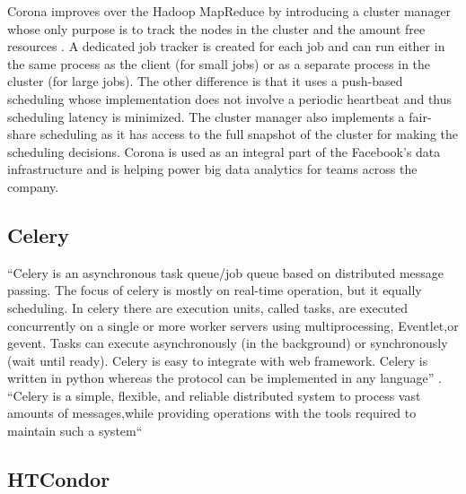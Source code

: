      Corona improves over the Hadoop MapReduce by introducing a
     cluster manager whose only purpose is to track the nodes in the
     cluster and the amount free resources
     \cite{www-facebook-corona}. A dedicated job tracker is created
     for each job and can run either in the same process as the
     client (for small jobs) or as a separate process in the cluster
     (for large jobs). The other difference is that it uses a
     push-based scheduling whose implementation does not involve a
     periodic heartbeat and thus scheduling latency is minimized. The
     cluster manager also implements a fair-share scheduling as it has
     access to the full snapshot of the cluster for making the
     scheduling decisions. Corona is used as an integral part of the
     Facebook's data infrastructure and is helping power big data
     analytics for teams across the company.
     
\subsection{Celery}

     ``Celery is an asynchronous task queue/job queue based on
     distributed message passing.  The focus of celery is mostly on
     real-time operation, but it equally scheduling.  In celery there
     are execution units, called tasks, are executed concurrently on a
     single or more worker servers using multiprocessing, Eventlet,or
     gevent.  Tasks can execute asynchronously (in the background) or
     synchronously (wait until ready).  Celery is easy to integrate
     with web framework. Celery is written in python whereas the
     protocol can be implemented in any language'' \cite{celery}. ``Celery
     is a simple, flexible, and reliable distributed system to process
     vast amounts of messages,while providing operations with the
     tools required to maintain such a system``\cite{celerydocs}

     
\subsection{HTCondor}

